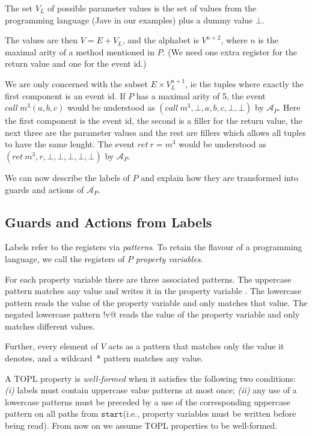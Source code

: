 \documentclass[9pt, preprint]{sigplanconf} %
\newcommand{\A}{\ensuremath{\mathcal{A}}}
\newcommand{\start}{\ensuremath{\mathtt{start}}\xspace}
\theoremstyle{definition}
\theoremstyle{remark}
\begin{document}
The set $V_L$ of possible parameter values is the set of values from
the programming language (Jave in our examples)
plus a dummy value $\bot$.

The values are then $V = E + V_L$, and the alphabet is $V^{n+2}$,
where $n$ is the maximal arity of a method mentioned in $P$.
(We need one extra register for the return value and one for the event
id.)

We are only concerned with the subset $E \times V_L^{n+1}$, ie the
tuples where exactly the first component is an event
id. If $P$ has a maximal arity of 5, the event $call\ m^3(a, b, c)$
would be understood as $(call\ m^3, \bot,  a, b, c, \bot, \bot)$ by
$\A_P$. Here the first component is the event id, the second is a
filler for the return value, the next three are the parameter values and the rest are
fillers which allows all tuples to have the same lenght. The event $ret\ r = m^3$
would be understood as $(ret\ m^3, r, \bot, \bot, \bot, \bot, \bot)$ by
$\A_P$.

We can now describe the labels of $P$ and explain how they are transformed into guards and
actions of $\A_P$.

\subsection{Guards and Actions from Labels}

Labels refer to the registers via \emph{patterns}. To retain the
flavour of a programming language, we call the registers of $P$
\emph{property variables}.

For each property variable \Verb@v@ there are three associated patterns.
The uppercase pattern \Verb@V@ matches any value and writes it in the property variable \Verb@v@.
The lowercase pattern \Verb@v@ reads the value of the property variable \Verb@v@ and only matches that value.
The negated lowercase pattern \Verb@!v@ reads the value of the
property variable \Verb@v@ and only matches different values.

Further, every element of $V$ acts as a pattern that matches only the value it denotes,
and a wildcard~* pattern matches any value.

\smallskip
A TOPL property is \emph{well-formed} when it satisfies the following two conditions:
{\em (i)} labels must contain uppercase value patterns at most once; {\em (ii)}
any use of a lowercase patterns must be preceded by a use of the corresponding uppercase pattern on all paths from \start  (i.e., property variables must be written before being read).
From now on we assume TOPL properties to be well-formed.
\end{document}
